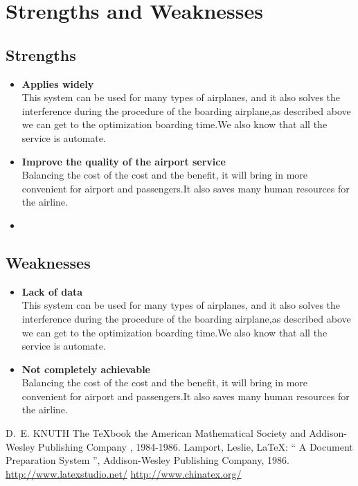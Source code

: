 \documentclass{mcmthesis}
\begin{document}
\section{Strengths and Weaknesses}%

\subsection{Strengths}
\begin{itemize}
\item \textbf{Applies widely}\\
This  system can be used for many types of airplanes, and it also
solves the interference during  the procedure of the boarding
airplane,as described above we can get to the  optimization
boarding time.We also know that all the service is automate.
\item \textbf{Improve the quality of the airport service}\\
Balancing the cost of the cost and the benefit, it will bring in
more convenient  for airport and passengers.It also saves many
human resources for the airline. 
\item \textbf{}
\end{itemize}

\subsection{Weaknesses}
\begin{itemize}
\item \textbf{Lack of data}\\
This  system can be used for many types of airplanes, and it also
solves the interference during  the procedure of the boarding
airplane,as described above we can get to the  optimization
boarding time.We also know that all the service is automate.
\item \textbf{Not completely achievable}\\
Balancing the cost of the cost and the benefit, it will bring in
more convenient  for airport and passengers.It also saves many
human resources for the airline. 
\end{itemize}

\begin{thebibliography}{99}
 D.~E. KNUTH   The \TeX{}book  the American
Mathematical Society and Addison-Wesley
Publishing Company , 1984-1986.
Lamport, Leslie,  \LaTeX{}: `` A Document Preparation System '',
Addison-Wesley Publishing Company, 1986.
\url{http://www.latexstudio.net/}
\url{http://www.chinatex.org/}
\end{thebibliography}
\end{document}
